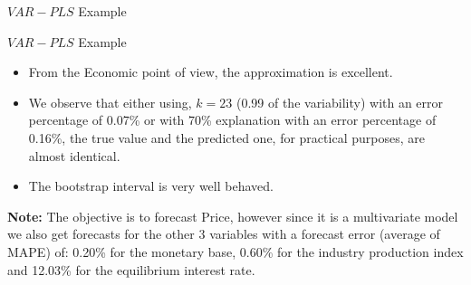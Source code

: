 \documentclass{beamer}
\newcommand{\?}{?`}
\begin{document}
\begin{frame}{$VAR-PLS$ Example}
  \begin{figure}[htbp]
  \end{figure}
  \end{frame}


\begin{frame}{$VAR-PLS$ Example}
\begin{footnotesize}
    \begin{itemize}
    \item From the Economic point of view, the approximation is excellent.

\item We observe that either using, $k=23$ (0.99 of the variability)
    with an error percentage of 0.07\% or with 70\% explanation
    with an error percentage of 0.16\%, the true value and the predicted one,
    for practical purposes, are almost identical.

\item The bootstrap interval is very well behaved.

    \end{itemize}
  \end{footnotesize}


  \textbf{Note: } The objective is to forecast Price, however since it is a multivariate model we also get forecasts for the other
  3 variables with a forecast error (average of MAPE) of: 0.20\% for the monetary base,
  0.60\% for the industry production index and 12.03\% for the equilibrium interest rate.

\end{frame}
\end{document}
